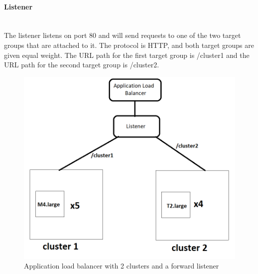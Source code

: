 \documentclass[11pt]{article}
\begin{document}
\paragraph{Listener}\mbox{}\\
The listener listens on port 80 and will send requests to one of the two target groups that are attached to it. The protocol is HTTP, and both target groups are given equal weight. The URL path for the first target group is /cluster1 and the URL path for the second target group is /cluster2.
\begin{figure}
    \includegraphics[width=\linewidth]{cluster.png}
    \caption{Application load balancer with 2 clusters and a forward listener}
    \label{fig:setup}
\end{figure}
\end{document}
